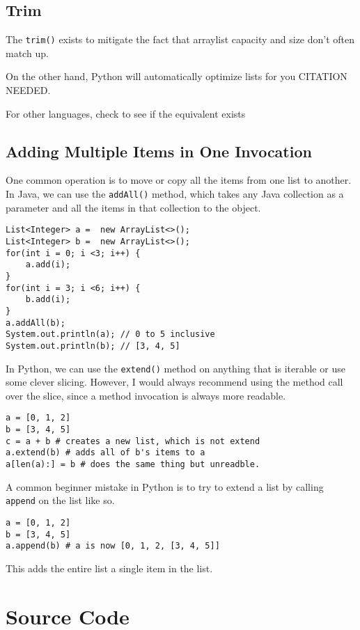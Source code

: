 \subsection{Trim}

The \texttt{trim()} exists to mitigate the fact that arraylist capacity and size don't often match up.



On the other hand, Python will automatically optimize lists for you CITATION NEEDED.

For other languages, check to see if the equivalent exists

\subsection{Adding Multiple Items in One Invocation}
One common operation is to move or copy all the items from one list to another.
In Java, we can use the \texttt{addAll()} method, which takes any Java collection as a parameter and all the items in that collection to the object.

\begin{verbatim}
List<Integer> a =  new ArrayList<>();
List<Integer> b =  new ArrayList<>();
for(int i = 0; i <3; i++) { 
	a.add(i); 
}
for(int i = 3; i <6; i++) { 
	b.add(i); 
}
a.addAll(b);
System.out.println(a); // 0 to 5 inclusive
System.out.println(b); // [3, 4, 5]
\end{verbatim}

In Python, we can use the \texttt{extend()} method on anything that is iterable or use some clever slicing.  However, I would always recommend using the method call over the slice, since a method invocation is always more readable.


\begin{verbatim}
a = [0, 1, 2]
b = [3, 4, 5]
c = a + b # creates a new list, which is not extend
a.extend(b) # adds all of b's items to a
a[len(a):] = b # does the same thing but unreadble.
\end{verbatim}
A common beginner mistake in Python is to try to extend a list by calling \texttt{append} on the list like so.

\begin{verbatim}
a = [0, 1, 2]
b = [3, 4, 5]
a.append(b) # a is now [0, 1, 2, [3, 4, 5]]
\end{verbatim}



This adds the entire list a single item in the list.  

\section{Source Code}
\inputminted{python3}{code/arraylist.py}